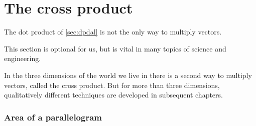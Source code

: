 \section{The cross product}
\label{sec:cp}
\secttoc



The dot product of \cref{sec:dpdal} is not the only way to multiply vectors.
\begin{aside}
This section is optional for us, 
but is vital in many topics of science and engineering.
\end{aside}%
In the three dimensions of the world we live in there is a second way to multiply vectors, called the cross product.
But for more than three dimensions, qualitatively different techniques are developed in subsequent chapters.


\subsubsection{Area of a parallelogram}

